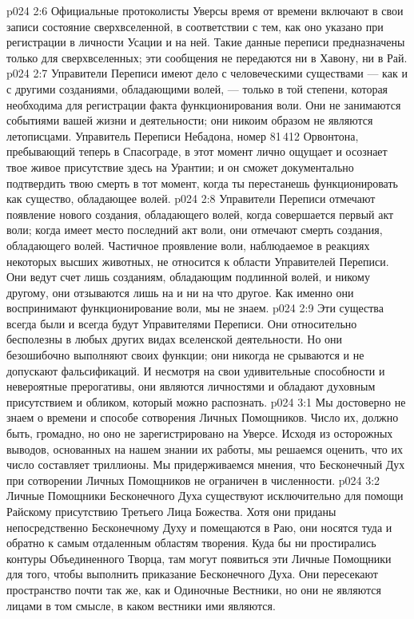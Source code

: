 \vs p024 2:6 Официальные протоколисты Уверсы время от времени включают в свои записи состояние сверхвселенной, в соответствии с тем, как оно указано при регистрации в личности Усации и на ней. Такие данные переписи предназначены только для сверхвселенных; эти сообщения не передаются ни в Хавону, ни в Рай.
\vs p024 2:7 \pc Управители Переписи имеют дело с человеческими существами --- как и с другими созданиями, обладающими волей, --- только в той степени, которая необходима для регистрации факта функционирования воли. Они не занимаются событиями вашей жизни и деятельности; они никоим образом не являются летописцами. Управитель Переписи Небадона, номер 81\,412 Орвонтона, пребывающий теперь в Спасограде, в этот момент лично ощущает и осознает твое живое присутствие здесь на Урантии; и он сможет документально подтвердить твою смерть в тот момент, когда ты перестанешь функционировать как существо, обладающее волей.
\vs p024 2:8 Управители Переписи отмечают появление нового создания, обладающего волей, когда совершается первый акт воли; когда имеет место последний акт воли, они отмечают смерть создания, обладающего волей. Частичное проявление воли, наблюдаемое в реакциях некоторых высших животных, не относится к области Управителей Переписи. Они ведут счет лишь созданиям, обладающим подлинной волей, и никому другому, они отзываются лишь на  и ни на что другое. Как именно они воспринимают функционирование воли, мы не знаем.
\enlargethispage*{\baselineskip}%
\vs p024 2:9 Эти существа всегда были и всегда будут Управителями Переписи. Они относительно бесполезны в любых других видах вселенской деятельности. Но они безошибочно выполняют своих функции; они никогда не срываются и не допускают фальсификаций. И несмотря на свои удивительные способности и невероятные прерогативы, они являются личностями и обладают духовным присутствием и обликом, который можно распознать.
\vs p024 3:1 Мы достоверно не знаем о времени и способе сотворения Личных Помощников. Число их, должно быть, громадно, но оно не зарегистрировано на Уверсе. Исходя из осторожных выводов, основанных на нашем знании их работы, мы решаемся оценить, что их число составляет триллионы. Мы придерживаемся мнения, что Бесконечный Дух при сотворении Личных Помощников не ограничен в численности.
\vs p024 3:2 Личные Помощники Бесконечного Духа существуют исключительно для помощи Райскому присутствию Третьего Лица Божества. Хотя они приданы непосредственно Бесконечному Духу и помещаются в Раю, они носятся туда и обратно к самым отдаленным областям творения. Куда бы ни простирались контуры Объединенного Творца, там могут появиться эти Личные Помощники для того, чтобы выполнить приказание Бесконечного Духа. Они пересекают пространство почти так же, как и Одиночные Вестники, но они не являются лицами в том смысле, в каком вестники ими являются.
